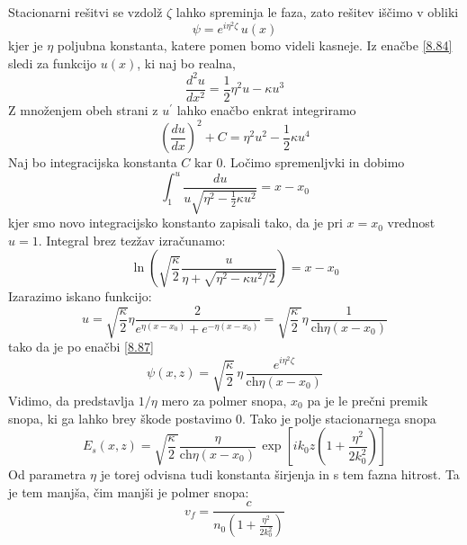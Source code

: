 \documentclass[11pt,fleqn]{book} %
\begin{document}
Stacionarni rešitvi se vzdolž $\zeta$ lahko spreminja le faza, zato
rešitev iščimo v obliki 
\begin{equation}
\psi=e^{i\eta^{2}\zeta}\, u(x)\label{8.87}
\end{equation}
 kjer je $\eta$ poljubna konstanta, katere pomen bomo videli kasneje.
Iz enačbe \ref{8.84} sledi za funkcijo $u(x)$, ki naj bo realna,
\begin{equation}
\frac{d^{2}u}{dx^{2}}=\frac{1}{2}\eta^{2}u-\kappa u^{3}
\end{equation}
 Z množenjem obeh strani z $u^{\prime}$ lahko enačbo enkrat integriramo
\begin{equation}
\left(\frac{du}{dx}\right)^{2}+C=\eta^{2}u^{2}-\frac{1}{2}\kappa u^{4}
\end{equation}
 Naj bo integracijska konstanta $C$ kar 0. Ločimo spremenljvki in
dobimo 
\begin{equation}
\int_{1}^{u}\frac{du}{u\sqrt{\eta^{2}-\frac{1}{2}\kappa u^{2}}}=x-x_{0}\label{8.85}
\end{equation}
 kjer smo novo integracijsko konstanto zapisali tako, da je pri $x=x_{0}$
vrednost $u=1$. Integral brez tezžav izračunamo: 
\begin{equation}
\ln\left(\sqrt{\frac{\kappa}{2}}\frac{u}{\eta+\sqrt{\eta^{2}-\kappa u^{2}/2}}\right)=x-x_{0}
\end{equation}
 Izarazimo iskano funkcijo: 
\begin{equation}
u=\sqrt{\frac{\kappa}{2}}\eta\frac{2}{e^{\eta(x-x_{0})}+e^{-\eta(x-x_{0})}}=\sqrt{\frac{\kappa}{2}\,}\eta\,\frac{1}{\text{ch}\eta(x-x_{0})}\label{8.86}
\end{equation}
 tako da je po enačbi \ref{8.87} 
\begin{equation}
\psi(x,z)=\sqrt{\frac{\kappa}{2}}\,\eta\,\frac{e^{i\eta^{2}\zeta}}{\text{ch}\eta(x-x_{0})}\label{8.88}
\end{equation}
 Vidimo, da predstavlja $1/\eta$ mero za polmer snopa, $x_{0}$ pa
je le prečni premik snopa, ki ga lahko brey škode postavimo 0. Tako
je polje stacionarnega snopa 
\begin{equation}
E_{s}(x,z)=\sqrt{\frac{\kappa}{2}\,}\frac{\eta}{\text{ch}\eta(x-x_{0})}\,\exp[ik_{0}z(1+\frac{\eta^{2}}{2k_{0}^{2}})]\label{8.89}
\end{equation}
 Od parametra $\eta$ je torej odvisna tudi konstanta širjenja in
s tem fazna hitrost. Ta je tem manjša, čim manjši je polmer snopa:
\begin{equation}
v_{f}=\frac{c}{n_{0}(1+\frac{\eta^{2}}{2k_{0}^{2}})}
\end{equation}
\end{document}
